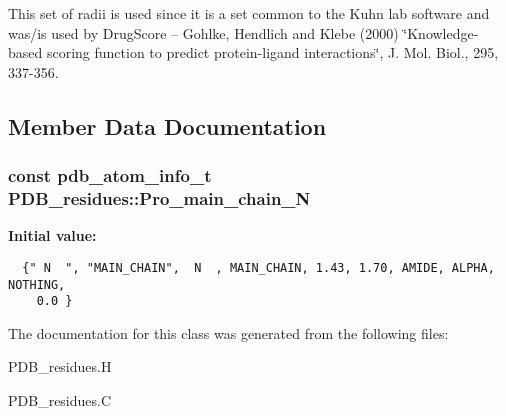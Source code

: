 This set of radii is used since it is a set common to the Kuhn lab software and was/is used by Drug\-Score -- Gohlke, Hendlich and Klebe (2000) \char`\"{}Knowledge-based scoring function to predict protein-ligand interactions\char`\"{}, J. Mol. Biol., 295, 337-356. 



\subsection{Member Data Documentation}
\subsubsection{\setlength{\rightskip}{0pt plus 5cm}const \bf{pdb\_\-atom\_\-info\_\-t} PDB\_\-residues::Pro\_\-main\_\-chain\_\-N\hspace{0.3cm}{\tt  [static, private]}}\label{classASCbase_1_1PDB__residues_cfc070f7fe10d5ab89d719e306d81485}


\textbf{Initial value:}

\begin{Code}\begin{verbatim}
  {" N  ", "MAIN_CHAIN",  N  , MAIN_CHAIN, 1.43, 1.70, AMIDE, ALPHA, NOTHING, 
    0.0 }
\end{verbatim}\end{Code}


The documentation for this class was generated from the following files:\begin{CompactItemize}
\item 
PDB\_\-residues.H\item 
PDB\_\-residues.C\end{CompactItemize}
